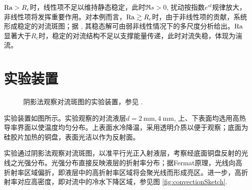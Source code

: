 \documentclass[aps,pre,12pt,preprint,%
	onecolumn,showpacs,showkeys,nofootinbib]{revtex4-1}
\newcommand{\rayleighNumber}{\mrm{Ra}}
\begin{document}
	$\rayleighNumber > R_c$时，线性项不足以维持静态稳定，此时$\Re s > 0$, 扰动按指数$e^{st}$规律放大，非线性项将发挥重要作用。对本例而言，$\rayleighNumber \gtrsim R_c$时，由于非线性项的贡献，系统形成稳定的对流斑图；据 \cite{textbook}, 其稳态解可由弱非线性情况下的多尺度分析给出。$\rayleighNumber$显著大于$R_c$时，稳定的对流结构不足以支撑能量传递，此时对流失稳，体现为湍流。
\restorejot
\section{实验装置}
\vspace{-.5\baselineskip}
	\begin{figure}[!ht]
		\centering
		\hspace{-.1\linewidth}%
		
		\par\vspace{.5\baselineskip}
		\caption[阴影法观察对流斑图的实验装置]{%
			阴影法观察对流斑图的实验装置，参见 \cite{textbook}. %
		}
		\label{fig:apparatus}
	\end{figure}
	实验装置如图所示。实验观察的对流液层$d = \SI{2}{\mm}, \SI{4}{\mm}$, 上、下表面均选用高热导率界面以使温度均匀分布。上表面水冷降温，采用透明介质以便于观察；底面为硅胶片加热的铜盘，表面光洁以作为反射面。
	
	实验通过阴影法观察对流斑图，以准平行光正入射液层，考察经底面铜盘反射的光线之光强分布。光强分布直接反映液层的折射率分布；据Fermat原理，光线向高折射率区域偏折，即液层中的高折射率区域将会聚光线而形成亮区。进一步，高折射率对应高密度，即对流中的冷水下降区域，参见图 \ref{fig:convectionSketch}. 
\clearpage
\end{document}
